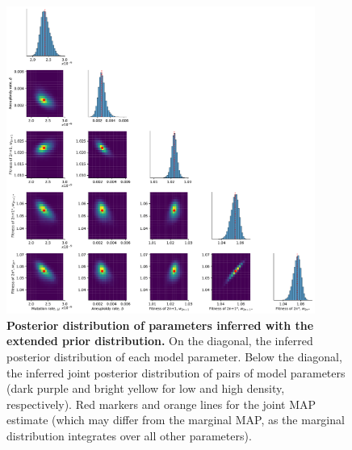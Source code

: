 \documentclass[12pt]{extarticle}
\begin{document}
\begin{figure}[p]
  \centering
\includegraphics[width=0.9\textwidth]{../figures/posterior-alt.pdf}
  \caption{
  \textbf{Posterior distribution of parameters inferred with the extended prior distribution.}
On the diagonal, the inferred posterior distribution of each model parameter. 
Below the diagonal, the inferred joint posterior distribution of pairs of model parameters (dark purple and bright yellow for low and high density, respectively). Red markers and orange lines for the joint MAP estimate (which may differ from the marginal MAP, as the marginal distribution integrates over all other parameters).
} 
  \label{fig:posterior-alt}
\end{figure}
\end{document}
